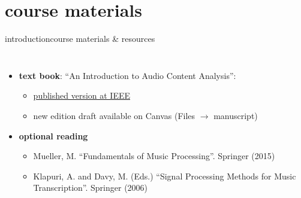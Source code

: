     \section[course materials]{course materials}
        \begin{frame}{introduction}{course materials \& resources}
            \vspace{-4mm}
            \begin{columns}[T]
                    \begin{itemize}
                        \item   \textbf{text book}: ``An Introduction to Audio Content Analysis'':
                        
                            
                            \begin{itemize}
                                \item   \href{https://ieeexplore.ieee.org/servlet/opac?bknumber=6266785}{published version at IEEE}
                                \item   new edition draft available on Canvas (Files $\rightarrow$ manuscript)
                            \end{itemize}

                        \smallskip
                        \item<2->  \textbf{optional reading}
                            
                            \begin{itemize}
                                \item   \footnotesize Mueller, M. ``Fundamentals of Music Processing''. Springer (2015)
                                \item   \footnotesize Klapuri, A. and Davy, M. (Eds.) ``Signal Processing Methods for Music Transcription''. Springer (2006)
                            \end{itemize}
                            \normalsize


\end{itemize}
\end{columns}
\end{frame}
